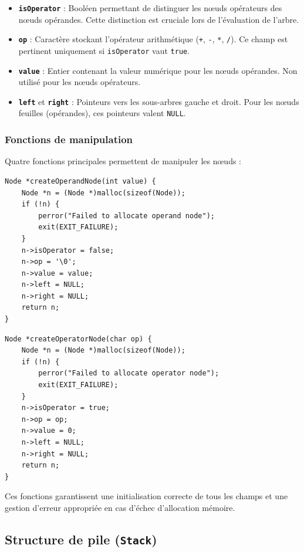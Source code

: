 \documentclass[12pt,a4paper]{article}
\begin{document}
\begin{itemize}
    \item \textbf{\texttt{isOperator}} : Booléen permettant de distinguer les nœuds opérateurs des nœuds opérandes. Cette distinction est cruciale lors de l'évaluation de l'arbre.
    \item \textbf{\texttt{op}} : Caractère stockant l'opérateur arithmétique (\texttt{+}, \texttt{-}, \texttt{*}, \texttt{/}). Ce champ est pertinent uniquement si \texttt{isOperator} vaut \texttt{true}.
    \item \textbf{\texttt{value}} : Entier contenant la valeur numérique pour les nœuds opérandes. Non utilisé pour les nœuds opérateurs.
    \item \textbf{\texttt{left}} et \textbf{\texttt{right}} : Pointeurs vers les sous-arbres gauche et droit. Pour les nœuds feuilles (opérandes), ces pointeurs valent \texttt{NULL}.
\end{itemize}

\subsubsection{Fonctions de manipulation}

Quatre fonctions principales permettent de manipuler les nœuds :

\begin{lstlisting}[caption={Création d'un nœud opérande}]
Node *createOperandNode(int value) {
    Node *n = (Node *)malloc(sizeof(Node));
    if (!n) {
        perror("Failed to allocate operand node");
        exit(EXIT_FAILURE);
    }
    n->isOperator = false;
    n->op = '\0';
    n->value = value;
    n->left = NULL;
    n->right = NULL;
    return n;
}
\end{lstlisting}

\begin{lstlisting}[caption={Création d'un nœud opérateur}]
Node *createOperatorNode(char op) {
    Node *n = (Node *)malloc(sizeof(Node));
    if (!n) {
        perror("Failed to allocate operator node");
        exit(EXIT_FAILURE);
    }
    n->isOperator = true;
    n->op = op;
    n->value = 0;
    n->left = NULL;
    n->right = NULL;
    return n;
}
\end{lstlisting}

Ces fonctions garantissent une initialisation correcte de tous les champs et une gestion d'erreur appropriée en cas d'échec d'allocation mémoire.

\subsection{Structure de pile (\texttt{Stack})}
\end{document}

